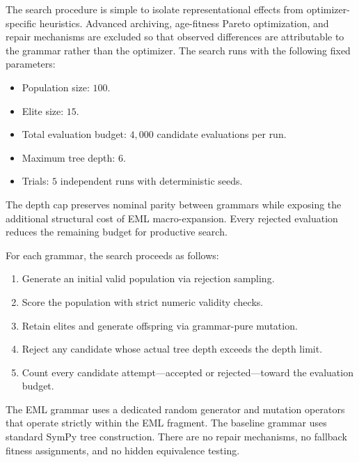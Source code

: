 \documentclass[runningheads]{llncs}
\begin{document}
The search procedure is simple to isolate representational effects from optimizer-specific heuristics. Advanced archiving, age-fitness Pareto optimization, and repair mechanisms are excluded so that observed differences are attributable to the grammar rather than the optimizer. The search runs with the following fixed parameters:
\begin{itemize}[itemsep=0pt,topsep=0pt]
  \item Population size: $100$.
  \item Elite size: $15$.
  \item Total evaluation budget: $4{,}000$ candidate evaluations per run.
  \item Maximum tree depth: $6$.
  \item Trials: $5$ independent runs with deterministic seeds.
\end{itemize}
The depth cap preserves nominal parity between grammars while
exposing the additional structural cost of EML macro-expansion. Every rejected
evaluation reduces the remaining budget for productive search.

For each grammar, the search proceeds as follows:
\begin{enumerate}[itemsep=0pt,topsep=0pt]
  \item Generate an initial valid population via rejection sampling.
  \item Score the population with strict numeric validity checks.
  \item Retain elites and generate offspring via grammar-pure mutation.
  \item Reject any candidate whose actual tree depth exceeds the depth limit.
  \item Count every candidate attempt---accepted or rejected---toward the
        evaluation budget.
\end{enumerate}

The EML grammar uses a dedicated random generator and mutation operators that
operate strictly within the EML fragment. The baseline grammar uses standard
SymPy tree construction. There are no repair mechanisms, no fallback fitness
assignments, and no hidden equivalence testing.
\end{document}
